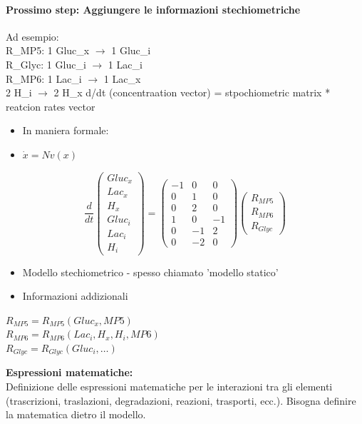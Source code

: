 \documentclass{article}
\begin{document}
\paragraph{Prossimo step: Aggiungere le informazioni stechiometriche}
Ad esempio:\\
R\_MP5: 1 Gluc\_x $\rightarrow$ 1 Gluc\_i\\
R\_Glyc: 1 Gluc\_i $\rightarrow$ 1 Lac\_i\\
R\_MP6: 1 Lac\_i $\rightarrow$ 1 Lac\_x\\
2 H\_i $\rightarrow$ 2 H\_x
d/dt (concentraation vector) = stpochiometric matrix * reatcion rates vector
\begin{itemize}
    \item In maniera formale:
    \item $\dot{x} = Nv(x)$
\end{itemize}
\[
\frac{d}{dt}
    \begin{pmatrix} 
        Gluc_x \\ 
        Lac_x \\
        H_x \\
        Gluc_i \\
        Lac_i \\
        H_i 
    \end{pmatrix} = \begin{pmatrix} 
        -1 & 0 & 0 \\ 
        0 & 1 & 0 \\
        0 & 2 & 0 \\
        1 & 0 & -1 \\
        0 & -1 & 2 \\
        0 & -2 & 0
    \end{pmatrix} \begin{pmatrix} 
        R_{MP5}\\ 
        R_{MP6}\\
        R_{Glyc} 
    \end{pmatrix}
    \]
\begin{itemize}
    \item Modello stechiometrico - spesso chiamato 'modello statico'
    \item Informazioni addizionali
\end{itemize}
\begin{flushright}
    $R_{MP5} = R_{MP5}(Gluc_x, MP5)$\\
    $R_{MP6} = R_{MP6}(Lac_i, H_x, H_i, MP6)$\\
    $R_{Glyc} = R_{Glyc}(Gluc_i, \dots )$
\end{flushright}
\textbf{Espressioni matematiche:}\\
Definizione delle espressioni matematiche per le interazioni tra gli elementi (trascrizioni, traslazioni, degradazioni, reazioni, trasporti, ecc.).
Bisogna definire la matematica dietro il modello.
\end{document}

